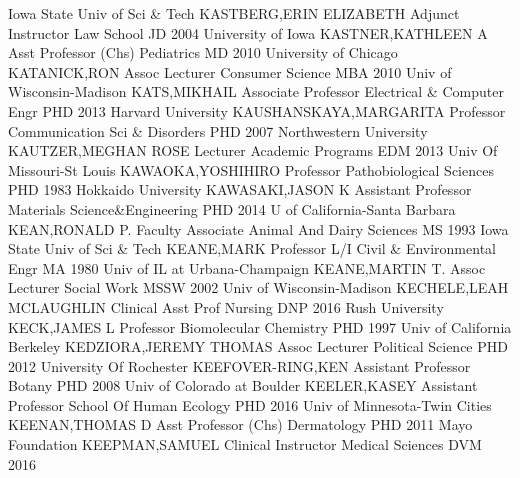 \documentclass[
]{article}
\begin{document}
Iowa State Univ of Sci \& Tech \textbar KASTBERG,ERIN ELIZABETH
\textbar{}  \textbar Adjunct Instructor \textbar Law School
\textbar JD 2004 University of Iowa \textbar KASTNER,KATHLEEN A
\textbar{}  \textbar Asst Professor (Chs)
\textbar Pediatrics \textbar MD 2010 University of Chicago
\textbar KATANICK,RON \textbar{}  \textbar Assoc Lecturer
\textbar Consumer Science \textbar MBA 2010 Univ of Wisconsin-Madison
\textbar KATS,MIKHAIL \textbar{}  \textbar Associate
Professor \textbar Electrical \& Computer Engr \textbar PHD 2013 Harvard
University \textbar KAUSHANSKAYA,MARGARITA \textbar{} 
\textbar Professor \textbar Communication Sci \& Disorders \textbar PHD
2007 Northwestern University \textbar KAUTZER,MEGHAN ROSE \textbar{}
 \textbar Lecturer \textbar Academic Programs \textbar EDM
2013 Univ Of Missouri-St Louis \textbar KAWAOKA,YOSHIHIRO \textbar{}
 \textbar Professor \textbar Pathobiological Sciences
\textbar PHD 1983 Hokkaido University \textbar KAWASAKI,JASON K
\textbar{}  \textbar Assistant Professor \textbar Materials
Science\&Engineering \textbar PHD 2014 U of California-Santa Barbara
\textbar KEAN,RONALD P. \textbar{}  \textbar Faculty
Associate \textbar Animal And Dairy Sciences \textbar MS 1993 Iowa State
Univ of Sci \& Tech \textbar KEANE,MARK \textbar{} 
\textbar Professor L/I \textbar Civil \& Environmental Engr \textbar MA
1980 Univ of IL at Urbana-Champaign \textbar KEANE,MARTIN T. \textbar{}
 \textbar Assoc Lecturer \textbar Social Work \textbar MSSW
2002 Univ of Wisconsin-Madison \textbar KECHELE,LEAH MCLAUGHLIN
\textbar{}  \textbar Clinical Asst Prof \textbar Nursing
\textbar DNP 2016 Rush University \textbar KECK,JAMES L \textbar{}
 \textbar Professor \textbar Biomolecular Chemistry
\textbar PHD 1997 Univ of California Berkeley \textbar KEDZIORA,JEREMY
THOMAS \textbar{}  \textbar Assoc Lecturer
\textbar Political Science \textbar PHD 2012 University Of Rochester
\textbar KEEFOVER-RING,KEN \textbar{}  \textbar Assistant
Professor \textbar Botany \textbar PHD 2008 Univ of Colorado at Boulder
\textbar KEELER,KASEY \textbar{}  \textbar Assistant
Professor \textbar School Of Human Ecology \textbar PHD 2016 Univ of
Minnesota-Twin Cities \textbar KEENAN,THOMAS D \textbar{} 
\textbar Asst Professor (Chs) \textbar Dermatology \textbar PHD 2011
Mayo Foundation \textbar KEEPMAN,SAMUEL \textbar{} 
\textbar Clinical Instructor \textbar Medical Sciences \textbar DVM 2016
\end{document}
